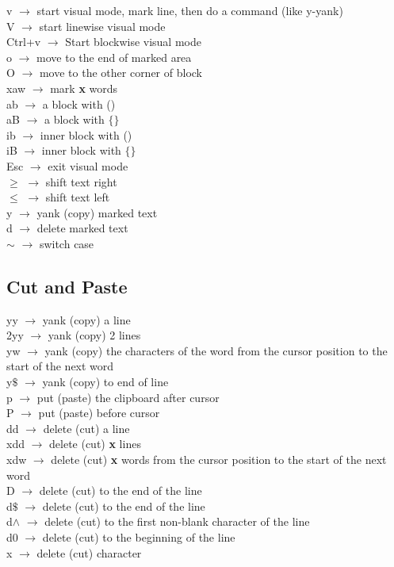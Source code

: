 \documentclass[twoside,a4paper]{article}
\newcommand{\tck}{\color{black}}
\newcommand{\ra }{$\rightarrow$ }
\begin{document}
\begin{multicols}{2}
    \tcr v \tck \ra start visual mode, mark line, then do a command (like y-yank)\\
    \tcr V \tck \ra start linewise visual mode\\
    \tcr Ctrl+v \tck \ra Start blockwise visual mode\\
    \tcr o \tck \ra move to the end of marked area\\
    \tcr O \tck \ra move to the other corner of block\\
    \tcr xaw \tck \ra mark \textbf{x} words\\
    \tcr ab \tck \ra a block with ()\\
    \tcr aB \tck \ra a block with $\{ \}$\\
    \tcr ib \tck \ra inner block with ()\\
    \tcr iB \tck \ra inner block with $\{ \}$\\
    \tcr Esc \tck \ra exit visual mode\\
    \tcr $ \geq $ \tck \ra shift text right\\
    \tcr $\leq$ \tck \ra shift text left\\
    \tcr y \tck \ra yank (copy) marked text\\
    \tcr d \tck \ra delete marked text\\
    \tcr $\sim$ \tck \ra switch case

    \tcc \subsection{Cut and Paste}

    \tcr yy \tck \ra yank (copy) a line\\
    \tcr 2yy \tck \ra yank (copy) 2 lines\\
    \tcr yw \tck \ra yank (copy) the characters of the word from the cursor position to the start of
    the next word\\
    \tcr y$\$$ \tck \ra yank (copy) to end of line\\
    \tcr p \tck \ra put (paste) the clipboard after cursor\\
    \tcr P \tck \ra put (paste) before cursor\\
    \tcr dd \tck \ra delete (cut) a line\\
    \tcr xdd \tck \ra delete (cut) \textbf{x} lines\\
    \tcr xdw \tck \ra delete (cut) \textbf{x} words from the cursor position to the start of the
    next word\\
    \tcr D \tck \ra delete (cut) to the end of the line\\
    \tcr d$\$$ \tck \ra delete (cut) to the end of the line\\
    \tcr d$\wedge$ \tck \ra delete (cut) to the first non-blank character of the line\\
    \tcr d0 \tck \ra delete (cut) to the beginning of the line\\
    \tcr x \tck \ra delete (cut) character


\end{multicols}
\end{document}
